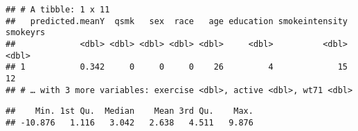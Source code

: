 \documentclass[
  10pt,
]{book}
\newenvironment{Shaded}{\begin{snugshade}}{\end{snugshade}}
\newcommand{\DecValTok}[1]{\textcolor[rgb]{0.00,0.00,0.81}{#1}}
\newcommand{\KeywordTok}[1]{\textcolor[rgb]{0.13,0.29,0.53}{\textbf{#1}}}
\newcommand{\NormalTok}[1]{#1}
\newcommand{\OperatorTok}[1]{\textcolor[rgb]{0.81,0.36,0.00}{\textbf{#1}}}
\newcommand{\StringTok}[1]{\textcolor[rgb]{0.31,0.60,0.02}{#1}}
\begin{document}
\begin{Shaded}
\end{Shaded}

\begin{verbatim}
## # A tibble: 1 x 11
##   predicted.meanY  qsmk   sex  race   age education smokeintensity smokeyrs
##             <dbl> <dbl> <dbl> <dbl> <dbl>     <dbl>          <dbl>    <dbl>
## 1           0.342     0     0     0    26         4             15       12
## # … with 3 more variables: exercise <dbl>, active <dbl>, wt71 <dbl>
\end{verbatim}

\begin{Shaded}
\end{Shaded}

\begin{verbatim}
##    Min. 1st Qu.  Median    Mean 3rd Qu.    Max. 
## -10.876   1.116   3.042   2.638   4.511   9.876
\end{verbatim}

\begin{Shaded}
\end{Shaded}
\end{document}
